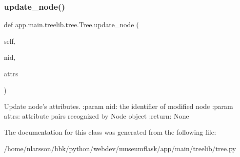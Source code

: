 \subsubsection{\texorpdfstring{update\+\_\+node()}{update\_node()}}
{\footnotesize\ttfamily def app.\+main.\+treelib.\+tree.\+Tree.\+update\+\_\+node (\begin{DoxyParamCaption}\item[{}]{self,  }\item[{}]{nid,  }\item[{}]{attrs }\end{DoxyParamCaption})}

\begin{DoxyVerb}Update node's attributes.
:param nid: the identifier of modified node
:param attrs: attribute pairs recognized by Node object
:return: None
\end{DoxyVerb}
 

The documentation for this class was generated from the following file\+:\begin{DoxyCompactItemize}
\item 
/home/nlarsson/bbk/python/webdev/museumflask/app/main/treelib/tree.\+py\end{DoxyCompactItemize}
